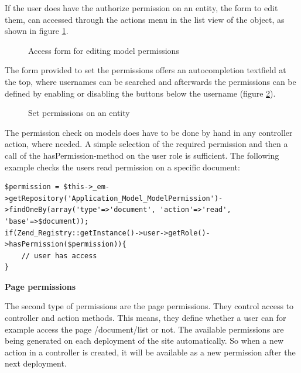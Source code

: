 If the user does have the authorize permission on an entity, the form to edit them, can accessed through the actions menu in the list view of the object, as shown in figure \ref{fig:add-model-permission}. 

\begin{figure}[!h]
  \centering
  \caption{Access form for editing model permissions}
  \label{fig:add-model-permission}
\end{figure}

The form provided to set the permissions offers an autocompletion textfield at the top, where usernames can be searched and afterwards the permissions can be defined by enabling or disabling the buttons below the username (figure \ref{fig:set-model-permissions}).

\begin{figure}[!h]
  \centering
  \caption{Set permissions on an entity}
  \label{fig:set-model-permissions}
\end{figure}

The permission check on models does have to be done by hand in any controller action, where needed. A simple selection of the required permission and then a call of the hasPermission-method on the user role is sufficient. The following example checks the users read permission on a specific document:

\begin{lstlisting}[caption=Checking the user permission on an entity]
$permission = $this->_em->getRepository('Application_Model_ModelPermission')->findOneBy(array('type'=>'document', 'action'=>'read', 'base'=>$document));
if(Zend_Registry::getInstance()->user->getRole()->hasPermission($permission)){
	// user has access
}
\end{lstlisting}

\textbf{Page permissions}

The second type of permissions are the page permissions. They control access to controller and action methods. This means, they define whether a user can for example access the page /document/list or not. The available permissions are being generated on each deployment of the site automatically. So when a new action in a controller is created, it will be available as a new permission after the next deployment.
